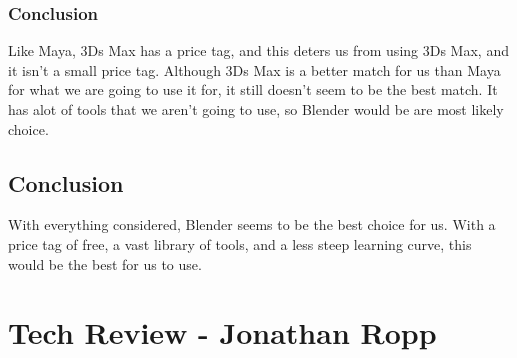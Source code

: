 \documentclass[onecolumn, draftclsnofoot,10pt, compsoc]{IEEEtran}
\begin{document}
\subsubsection{Conclusion}
Like Maya, 3Ds Max has a price tag, and this deters us from using 3Ds Max, and it isn't a small price tag. Although 3Ds Max is a better match for us than Maya for what we are going to use it for, it still doesn't seem to be the best match. It has alot of tools that we aren't going to use, so Blender would be are most likely choice. 
\subsection{Conclusion}
With everything considered, Blender seems to be the best choice for us. With a price tag of free, a vast library of tools, and a less steep learning curve, this would be the best for us to use.

\section{Tech Review - Jonathan Ropp}
\end{document}
